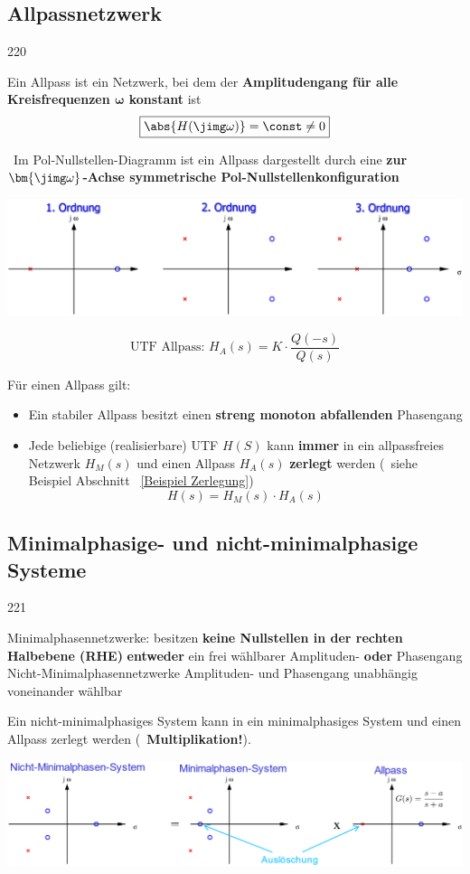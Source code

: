 \subsection{Allpassnetzwerk}{220}

Ein Allpass ist ein Netzwerk, bei dem der \textbf{Amplitudengang für alle Kreisfrequenzen $\bm{\omega}$ konstant} ist
$$ \boxed{\abs{H(\jimg \omega)} = \const \neq 0}$$

\textrightarrow\ Im Pol-Nullstellen-Diagramm ist ein Allpass dargestellt durch eine 
\textbf{zur $\bm{\jimg \omega}$-Achse symmetrische Pol-Nullstellenkonfiguration}

\includegraphics[width=\columnwidth]{images/allpass.png}

$$ \boxed{ \text{UTF Allpass: } H_A(s) = K \cdot \frac{Q(-s)}{Q(s)} } $$

Für einen Allpass gilt:
\begin{itemize}
    \item Ein stabiler Allpass besitzt einen \textbf{streng monoton abfallenden} Phasengang
    \item Jede beliebige (realisierbare) UTF $H(S)$ kann \textbf{immer} in ein allpassfreies Netzwerk $H_M(s)$ und einen Allpass $H_A(s)$
        \textbf{zerlegt} werden (\textrightarrow\ siehe Beispiel Abschnitt ~\ref{Beispiel Zerlegung})
        $$ \boxed{ H(s) = H_M(s) \cdot H_A(s) }$$
\end{itemize}


\subsection{Minimalphasige- und nicht-minimalphasige Systeme}{221}

\begin{outline}
    \1 Minimalphasennetzwerke: 
        \2 besitzen \textbf{keine Nullstellen in der rechten Halbebene (RHE)}
        \2 \textbf{entweder} ein frei wählbarer Amplituden- \textbf{oder} Phasengang
    \1 Nicht-Minimalphasennetzwerke
        \2 Amplituden- und Phasengang unabhängig voneinander wählbar
\end{outline}


\label{Beispiel Zerlegung}

Ein nicht-minimalphasiges System kann in ein minimalphasiges System und einen Allpass zerlegt werden
(\textrightarrow\ \textbf{Multiplikation!}). 

\includegraphics[width=\columnwidth]{images/beispiel_minimalphasensystem.png}



